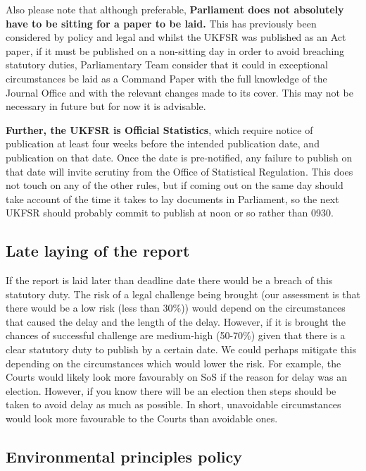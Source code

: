 \documentclass[
]{book}
\begin{document}
Also please note that although preferable, \textbf{Parliament does not absolutely have
to be sitting for a paper to be laid.} This has previously been considered by
policy and legal and whilst the UKFSR was published as an Act paper, if it must
be published on a non-sitting day in order to avoid breaching statutory duties,
Parliamentary Team consider that it could in exceptional circumstances be laid
as a Command Paper with the full knowledge of the Journal Office and with the
relevant changes made to its cover. This may not be necessary in future but for
now it is advisable.

\textbf{Further, the UKFSR is Official Statistics}, which require notice of publication
at least four weeks before the intended publication date, and publication on
that date. Once the date is pre-notified, any failure to publish on that date
will invite scrutiny from the Office of Statistical Regulation. This does not
touch on any of the other rules, but if coming out on the same day should take
account of the time it takes to lay documents in Parliament, so the next UKFSR
should probably commit to publish at noon or so rather than 0930.

\hypertarget{late-laying-of-the-report}{%
\subsection{Late laying of the report}\label{late-laying-of-the-report}}

If the report is laid later than deadline date there would be a breach of this
statutory duty. The risk of a legal challenge being brought (our assessment is
that there would be a low risk (less than 30\%)) would depend on the
circumstances that caused the delay and the length of the delay. However, if it
is brought the chances of successful challenge are medium-high (50-70\%) given
that there is a clear statutory duty to publish by a certain date. We could
perhaps mitigate this depending on the circumstances which would lower the risk.
For example, the Courts would likely look more favourably on SoS if the reason
for delay was an election. However, if you know there will be an election then
steps should be taken to avoid delay as much as possible. In short, unavoidable
circumstances would look more favourable to the Courts than avoidable ones.

\hypertarget{environmental-principles-policy}{%
\subsection{Environmental principles policy}\label{environmental-principles-policy}}
\end{document}
